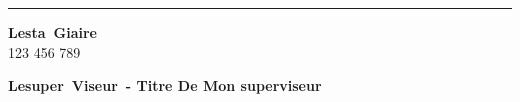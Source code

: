 \documentclass[12pt]{article} 	%
\newcommand\prenomStagiaire{Lesta}
\newcommand\nomStagiaire{Giaire}
\newcommand\idul{123 456 789}
\newcommand\prenomSuperviseur{Lesuper}
\newcommand\nomSuperviseur{Viseur}
\newcommand\titreSuperviseur{Titre De Mon superviseur}
\begin{document}
\par\noindent\rule{\textwidth}{0.4pt}
\begin{minipage}[t]{6cm}
    \begin{flushleft}
        \textbf {\prenomStagiaire~\nomStagiaire}\\
        \idul
    \end{flushleft}
\end{minipage}
\begin{minipage}[t]{10cm}
    \begin{flushright}
        \hspace*{1cm}\textbf {\prenomSuperviseur~\nomSuperviseur~- \titreSuperviseur} \\
    \end{flushright}
\end{minipage}

\newpage
{}

\newpage
 


\newpage
\tableofcontents


\newpage
\listoftables


\newpage
\listoffigures


\newpage

\break


\newpage
{}




\newpage



\newpage



\newpage

\end{document}
